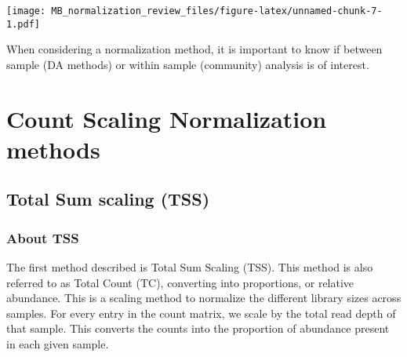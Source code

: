 \documentclass[
]{book}
\newenvironment{Shaded}{\begin{snugshade}}{\end{snugshade}}
\newcommand{\CommentTok}[1]{\textcolor[rgb]{0.56,0.35,0.01}{\textit{#1}}}
\newcommand{\DataTypeTok}[1]{\textcolor[rgb]{0.13,0.29,0.53}{#1}}
\newcommand{\KeywordTok}[1]{\textcolor[rgb]{0.13,0.29,0.53}{\textbf{#1}}}
\newcommand{\NormalTok}[1]{#1}
\newcommand{\OperatorTok}[1]{\textcolor[rgb]{0.81,0.36,0.00}{\textbf{#1}}}
\newcommand{\StringTok}[1]{\textcolor[rgb]{0.31,0.60,0.02}{#1}}
\begin{document}
\begin{Shaded}
\end{Shaded}

\texttt{[image: MB\_normalization\_review\_files/figure-latex/unnamed-chunk-7-1.pdf]}

When considering a normalization method, it is important to know if between sample (DA methods) or within sample (community) analysis is of interest.

\hypertarget{count-scaling-normalization-methods}{%
\chapter{Count Scaling Normalization methods}\label{count-scaling-normalization-methods}}

\hypertarget{total-sum-scaling-tss}{%
\section{Total Sum scaling (TSS)}\label{total-sum-scaling-tss}}

\hypertarget{about-tss}{%
\subsection{About TSS}\label{about-tss}}

The first method described is Total Sum Scaling (TSS). This method is also referred to as Total Count (TC), converting into proportions, or relative abundance. This is a scaling method to normalize the different library sizes across samples. For every entry in the count matrix, we scale by the total read depth of that sample. This converts the counts into the proportion of abundance present in each given sample.
\end{document}
